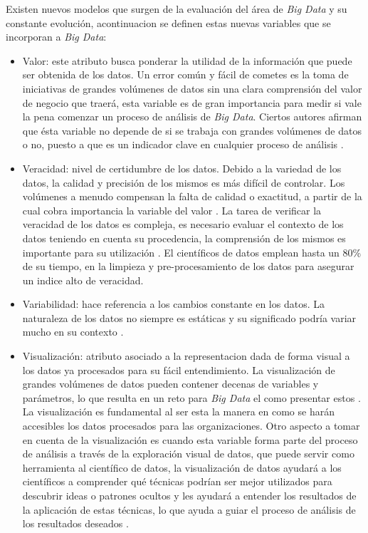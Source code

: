 Existen nuevos modelos que surgen de la evaluación del área de \emph{Big Data} y su constante evolución, acontinuacion se definen estas nuevas variables que se incorporan a \emph{Big Data}:

 \begin{itemize}
 \item Valor: este atributo busca ponderar la utilidad de la información que puede ser obtenida de los datos. Un error común y fácil de cometes es la toma de iniciativas de grandes volúmenes de datos sin una clara comprensión del valor de negocio que traerá, esta variable es de gran importancia para medir si vale la pena comenzar un proceso de análisis de \emph{Big Data}. Ciertos autores afirman que ésta variable no depende de si se trabaja con grandes volúmenes de datos o no, puesto a que es un indicador clave en cualquier proceso de análisis \cite{16}.
 
\item Veracidad: nivel de certidumbre de los datos. Debido a la variedad de los datos, la calidad y precisión de los mismos es más difícil de controlar. Los volúmenes a menudo compensan la falta de calidad o exactitud, a partir de la cual cobra importancia la variable del valor \cite{13bernard}. La tarea de verificar la veracidad de los datos es compleja, es necesario evaluar el contexto de los datos teniendo en cuenta su procedencia, la comprensión de los mismos es importante para su utilización \cite
{18}. El científicos de datos emplean hasta un 80\% de su tiempo, en la limpieza y pre-procesamiento de los datos para asegurar un indice alto de veracidad.

\item Variabilidad: hace referencia a los cambios constante en los datos. La naturaleza de los datos no siempre es estáticas y su significado podría variar mucho en su contexto \cite{15}.

\item Visualización: atributo asociado a la representacion dada de forma visual a los datos ya procesados para su fácil entendimiento. La visualización de grandes volúmenes de datos pueden contener decenas de variables y parámetros, lo que resulta en un reto para \emph{Big Data} el como presentar estos \cite{15}. La visualización es fundamental al ser esta la manera en como se harán accesibles los datos procesados para las organizaciones. Otro aspecto a tomar en cuenta de la visualización es cuando esta variable forma parte del proceso de análisis a través de la exploración visual de datos, que puede servir como herramienta al científico de datos, la visualización de datos ayudará a los científicos a comprender qué técnicas podrían ser mejor utilizados para descubrir ideas o patrones ocultos y les ayudará a entender los resultados de la aplicación de estas técnicas, lo que ayuda a guiar el proceso de análisis de los resultados deseados \cite{17}.


\end{itemize}

